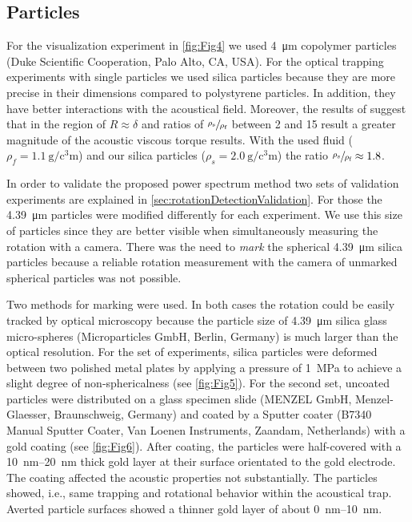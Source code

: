 \subsection{Particles \label{sec:particles}}
For the visualization experiment in \cref{fig:Fig4} we used \SI{4}{\micro\meter} 
copolymer particles (Duke Scientific Cooperation, Palo Alto, CA, USA). For the 
optical trapping experiments with single particles we used silica particles 
because they are more precise in their dimensions compared to polystyrene 
particles. In addition, they have better interactions
with the acoustical field. Moreover, the results of \citeauthor{hahn2016} 
\cite{hahn2016} suggest that in the region of $R \approx \delta$ and ratios of 
$\sfrac{\rho_{\text{s}}}{\rho_{\text{f}}}$ between 2 and 15 result a greater 
magnitude of the acoustic viscous torque results. With the used fluid ($\rho_{f} 
= \SI{1.1}{\gram\per\cubic\centi\meter}$) and our silica particles ($\rho_{s} = 
\SI{2.0}{\gram\per\cubic\centi\meter}$) the ratio 
$\sfrac{\rho_{\text{s}}}{\rho_{\text{f}}} \approx 1.8$.

In order to validate the proposed power spectrum method two sets of validation 
experiments are explained in \cref{sec:rotationDetectionValidation}. For those 
the \SI{4.39}{\micro\meter} particles were modified differently for each 
experiment. We use this size of particles since they are better visible when 
simultaneously measuring the rotation with a camera. There was the need to 
\emph{mark} the spherical \SI{4.39}{\micro\meter} silica particles because a 
reliable rotation measurement with the camera of unmarked spherical particles 
was not possible.

Two methods for marking were used. In both cases the rotation could be easily 
tracked by optical microscopy because the particle size of 
\SI{4.39}{\micro\meter} silica glass micro-spheres (Microparticles
GmbH, Berlin, Germany) is much larger than the optical resolution.
For the set of experiments, silica particles were deformed between two polished 
metal plates by applying a pressure of \SI{1}{\mega\pascal} to achieve a slight 
degree of non-sphericalness (see \cref{fig:Fig5}). For the second set, uncoated 
particles were distributed on a glass specimen slide (MENZEL GmbH, 
Menzel-Glaesser, Braunschweig, Germany) and coated by a Sputter coater (B7340 
Manual Sputter Coater, Van Loenen Instruments, Zaandam, Netherlands) with a gold 
coating (see \cref{fig:Fig6}). After coating, the particles were half-covered 
with a \SIrange{10}{20}{\nano\meter} thick gold layer at their surface 
orientated to the gold electrode. The coating affected the acoustic properties 
not substantially. The particles showed, i.e., same trapping and rotational 
behavior within the acoustical trap. Averted particle surfaces showed a thinner 
gold layer of about \SIrange{0}{10}{\nano\meter}.
